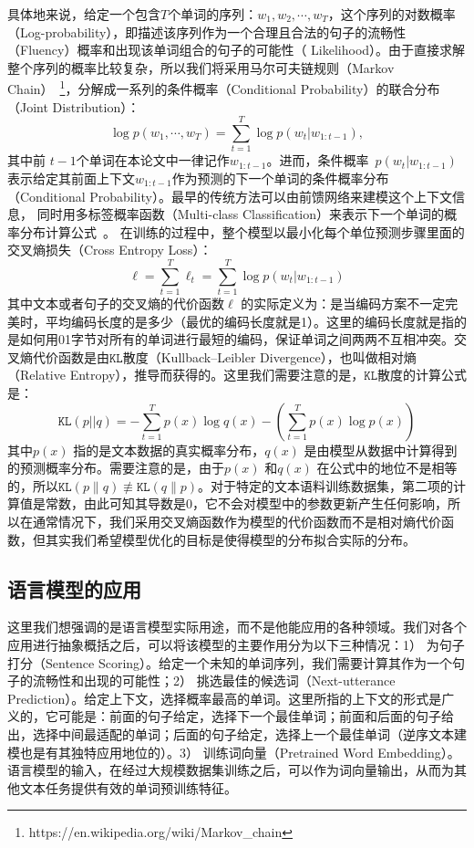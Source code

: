 具体地来说，给定一个包含$T$个单词的序列：$w_1,w_2,\cdots,w_T$，这个序列的对数概率（Log-probability），即描述该序列作为一个合理且合法的句子的流畅性（Fluency）概率和出现该单词组合的句子的可能性（ Likelihood）。由于直接求解整个序列的概率比较复杂，所以我们将采用马尔可夫链规则（Markov Chain）~\footnote{https://en.wikipedia.org/wiki/Markov\_chain}，分解成一系列的条件概率（Conditional Probability）的联合分布（Joint Distribution）：
\begin{equation}
\label{laguage_model}
 \log p(w_1,\cdots, w_T ) = \sum_{t=1}^T \log p(w_t | w_{1:t-1}),
\end{equation}
其中前 $t-1$个单词在本论文中一律记作$w_ {1:t-1}$。进而，条件概率~$p(w_t | w_ {1:t-1})$表示给定其前面上下文$w_ {1:t-1} $作为预测的下一个单词的条件概率分布（Conditional Probability）。最早的传统方法可以由前馈网络来建模这个上下文信息， 同时用多标签概率函数（Multi-class Classification）来表示下一个单词的概率分布计算公式~。 在训练的过程中，整个模型以最小化每个单位预测步骤里面的交叉熵损失（Cross Entropy Loss）：
\begin{equation}\label{equ:losses2}
  \ell=\sum_{t=1}^{T}\ell_t=\sum_{t=1}^{T}\log p(w_t | w_{1:t-1})
\end{equation}
其中文本或者句子的交叉熵的代价函数$\ell$ 的实际定义为：是当编码方案不一定完美时，平均编码长度的是多少（最优的编码长度就是1）。这里的编码长度就是指的是如何用01字节对所有的单词进行最短的编码，保证单词之间两两不互相冲突。交叉熵代价函数是由$\texttt{KL}$散度（Kullback–Leibler Divergence），也叫做相对熵（Relative Entropy），推导而获得的。这里我们需要注意的是，$  \texttt{KL}$散度的计算公式是：
\begin{equation}\label{equ:losses}
  \texttt{KL}(p||q)=-\sum_{t=1}^{T}p(x)\log q(x) - (\sum_{t=1}^{T}p(x)\log p(x))
\end{equation}
其中$p(x)$ 指的是文本数据的真实概率分布，$q(x)$ 是由模型从数据中计算得到的预测概率分布。需要注意的是，由于$p(x)$ 和$q(x)$ 在公式中的地位不是相等的，所以$\texttt{KL} (p\parallel q)\not\equiv \texttt{KL}(q\parallel p)$。对于特定的文本语料训练数据集，第二项的计算值是常数，由此可知其导数是0，它不会对模型中的参数更新产生任何影响，所以在通常情况下，我们采用交叉熵函数作为模型的代价函数而不是相对熵代价函数，但其实我们希望模型优化的目标是使得模型的分布拟合实际的分布。
\subsection{语言模型的应用}
这里我们想强调的是语言模型实际用途，而不是他能应用的各种领域。我们对各个应用进行抽象概括之后，可以将该模型的主要作用分为以下三种情况：1） 为句子打分（Sentence Scoring）。给定一个未知的单词序列，我们需要计算其作为一个句子的流畅性和出现的可能性；2） 挑选最佳的候选词（Next-utterance Prediction）。给定上下文，选择概率最高的单词。这里所指的上下文的形式是广义的，它可能是：前面的句子给定，选择下一个最佳单词；前面和后面的句子给出，选择中间最适配的单词；后面的句子给定，选择上一个最佳单词（逆序文本建模也是有其独特应用地位的）。3） 训练词向量（Pretrained Word Embedding）。语言模型的输入，在经过大规模数据集训练之后，可以作为词向量输出，从而为其他文本任务提供有效的单词预训练特征。


